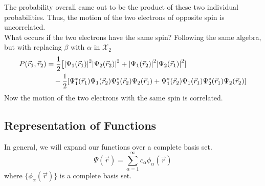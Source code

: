 \documentclass[12pt,a4paper,titlepage]{article}
\newcommand{\Chi}{\mathcal{X}} %
\begin{document}
{The probability overall came out to be the product of these two individual probabilities. Thus, the motion of the two electrons of opposite spin is uncorrelated.\\

What occurs if the two electrons have the same spin? Following the same algebra, but with replacing $\beta$ with $\alpha$ in $\Chi_{2}$
\begin{equation}
\begin{aligned}
P(\vec{r}_{1},\vec{r}_{2})&=\frac{1}{2}\big[\abs{\Psi_{1}(\vec{r}_{1})}^{2}\abs{\Psi_{2}(\vec{r}_{2})}^{2}+\abs{\Psi_{1}(\vec{r}_{2})}^{2}\abs{\Psi_{2}(\vec{r}_{1})}^{2}]\\
&\quad-\frac{1}{2}\qty[\Psi_{1}^{*}(\vec{r}_{1})\Psi_{1}(\vec{r}_{2})\Psi_{2}^{*}(\vec{r}_{2})\Psi_{2}(\vec{r}_{1})+\Psi_{1}^{*}(\vec{r}_{2})\Psi_{1}(\vec{r}_{1})\Psi_{2}^{*}(\vec{r}_{1})\Psi_{2}(\vec{r}_{2})]
\end{aligned}
\end{equation}
Now the motion of the two electrons with the same spin is correlated.
}

\subsection{Representation of Functions}
In general, we will expand our functions over a complete basis set.
\begin{equation}
\Psi(\vec{r})=\sum_{\alpha=1}^{\infty}c_{\alpha}\phi_{\alpha}(\vec{r})
\end{equation}
where $\{\phi_{\alpha}(\vec{r})\}$ is a complete basis set.\\
\end{document}
